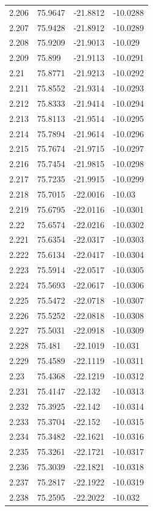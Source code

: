 \begin{tabular}{llll}
2.206 & 75.9647 & -21.8812 & -10.0288 \\
2.207 & 75.9428 & -21.8912 & -10.0289 \\
2.208 & 75.9209 & -21.9013 & -10.029 \\
2.209 & 75.899 & -21.9113 & -10.0291 \\
2.21 & 75.8771 & -21.9213 & -10.0292 \\
2.211 & 75.8552 & -21.9314 & -10.0293 \\
2.212 & 75.8333 & -21.9414 & -10.0294 \\
2.213 & 75.8113 & -21.9514 & -10.0295 \\
2.214 & 75.7894 & -21.9614 & -10.0296 \\
2.215 & 75.7674 & -21.9715 & -10.0297 \\
2.216 & 75.7454 & -21.9815 & -10.0298 \\
2.217 & 75.7235 & -21.9915 & -10.0299 \\
2.218 & 75.7015 & -22.0016 & -10.03 \\
2.219 & 75.6795 & -22.0116 & -10.0301 \\
2.22 & 75.6574 & -22.0216 & -10.0302 \\
2.221 & 75.6354 & -22.0317 & -10.0303 \\
2.222 & 75.6134 & -22.0417 & -10.0304 \\
2.223 & 75.5914 & -22.0517 & -10.0305 \\
2.224 & 75.5693 & -22.0617 & -10.0306 \\
2.225 & 75.5472 & -22.0718 & -10.0307 \\
2.226 & 75.5252 & -22.0818 & -10.0308 \\
2.227 & 75.5031 & -22.0918 & -10.0309 \\
2.228 & 75.481 & -22.1019 & -10.031 \\
2.229 & 75.4589 & -22.1119 & -10.0311 \\
2.23 & 75.4368 & -22.1219 & -10.0312 \\
2.231 & 75.4147 & -22.132 & -10.0313 \\
2.232 & 75.3925 & -22.142 & -10.0314 \\
2.233 & 75.3704 & -22.152 & -10.0315 \\
2.234 & 75.3482 & -22.1621 & -10.0316 \\
2.235 & 75.3261 & -22.1721 & -10.0317 \\
2.236 & 75.3039 & -22.1821 & -10.0318 \\
2.237 & 75.2817 & -22.1922 & -10.0319 \\
2.238 & 75.2595 & -22.2022 & -10.032 \\

\end{tabular}
